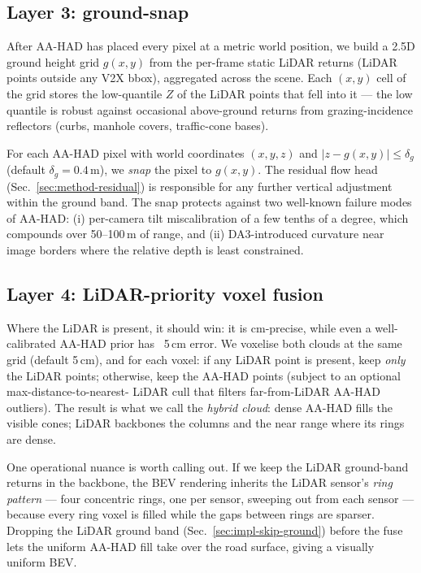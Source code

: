 \documentclass[10pt,twocolumn,letterpaper]{article}
\begin{document}
\subsection{Layer 3: ground-snap}
\label{sec:method-ground}

After AA-HAD has placed every pixel at a metric world position, we
build a 2.5D ground height grid $g(x, y)$ from the per-frame static
LiDAR returns (LiDAR points outside any V2X bbox), aggregated across
the scene. Each $(x, y)$ cell of the grid stores the low-quantile $Z$
of the LiDAR points that fell into it — the low quantile is robust
against occasional above-ground returns from grazing-incidence
reflectors (curbs, manhole covers, traffic-cone bases).

For each AA-HAD pixel with world coordinates $(x, y, z)$ and
$|z - g(x,y)| \le \delta_g$ (default $\delta_g = 0.4$\,m), we
\emph{snap} the pixel to $g(x, y)$. The residual flow head
(Sec.~\ref{sec:method-residual}) is responsible for any further
vertical adjustment within the ground band. The snap protects against
two well-known failure modes of AA-HAD: (i) per-camera tilt
miscalibration of a few tenths of a degree, which compounds over
50–100\,m of range, and (ii) DA3-introduced curvature near image
borders where the relative depth is least constrained.


\subsection{Layer 4: LiDAR-priority voxel fusion}
\label{sec:method-fuse}

Where the LiDAR is present, it should win: it is cm-precise, while
even a well-calibrated AA-HAD prior has ~5\,cm error. We voxelise both
clouds at the same grid (default 5\,cm), and for each voxel: if any
LiDAR point is present, keep \emph{only} the LiDAR points; otherwise,
keep the AA-HAD points (subject to an optional max-distance-to-nearest-
LiDAR cull that filters far-from-LiDAR AA-HAD outliers). The result
is what we call the \emph{hybrid cloud}: dense AA-HAD fills the
visible cones; LiDAR backbones the columns and the near range where
its rings are dense.

One operational nuance is worth calling out. If we keep the LiDAR
ground-band returns in the backbone, the BEV rendering inherits the
LiDAR sensor's \emph{ring pattern} — four concentric rings, one per
sensor, sweeping out from each sensor — because every ring voxel is
filled while the gaps between rings are sparser. Dropping the LiDAR
ground band (Sec.~\ref{sec:impl-skip-ground}) before the fuse lets the
uniform AA-HAD fill take over the road surface, giving a visually
uniform BEV.
\end{document}
